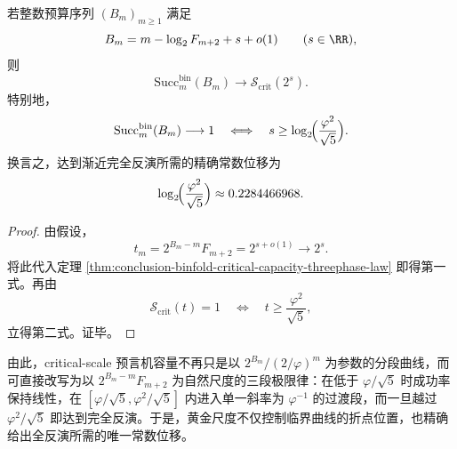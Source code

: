 \begin{corollary}[完全反演阈值的精确常数位移]\label{cor:conclusion-binfold-full-inversion-golden-threshold}
若整数预算序列 \((B_m)_{m\ge 1}\) 满足
\[
B_m=m-\log_2F_{m+2}+s+o(1)
\qquad (s\in\RR),
\]
则
\[
\mathrm{Succ}_m^{\mathrm{bin}}(B_m)\longrightarrow \mathcal S_{\mathrm{crit}}(2^s).
\]
特别地，
\[
\mathrm{Succ}_m^{\mathrm{bin}}(B_m)\longrightarrow 1
\quad\Longleftrightarrow\quad
s\ge \log_2\!\Bigl(\frac{\varphi^2}{\sqrt5}\Bigr).
\]
换言之，达到渐近完全反演所需的精确常数位移为
\[
\log_2\!\Bigl(\frac{\varphi^2}{\sqrt5}\Bigr)\approx 0.2284466968.
\]
\end{corollary}
\begin{proof}
由假设，
\[
t_m
=
2^{B_m-m}F_{m+2}
=
2^{s+o(1)}
\longrightarrow
2^s.
\]
将此代入定理 \ref{thm:conclusion-binfold-critical-capacity-threephase-law} 即得第一式。再由
\[
\mathcal S_{\mathrm{crit}}(t)=1
\quad\Longleftrightarrow\quad
t\ge \frac{\varphi^2}{\sqrt5},
\]
立得第二式。证毕。
\end{proof}

\noindent
由此，critical-scale 预言机容量不再只是以 \(2^{B_m}/(2/\varphi)^m\) 为参数的分段曲线，而可直接改写为以 \(2^{B_m-m}F_{m+2}\) 为自然尺度的三段极限律：在低于 \(\varphi/\sqrt5\) 时成功率保持线性，在 \([\varphi/\sqrt5,\varphi^2/\sqrt5]\) 内进入单一斜率为 \(\varphi^{-1}\) 的过渡段，而一旦越过 \(\varphi^2/\sqrt5\) 即达到完全反演。于是，黄金尺度不仅控制临界曲线的折点位置，也精确给出全反演所需的唯一常数位移。

\endinput
